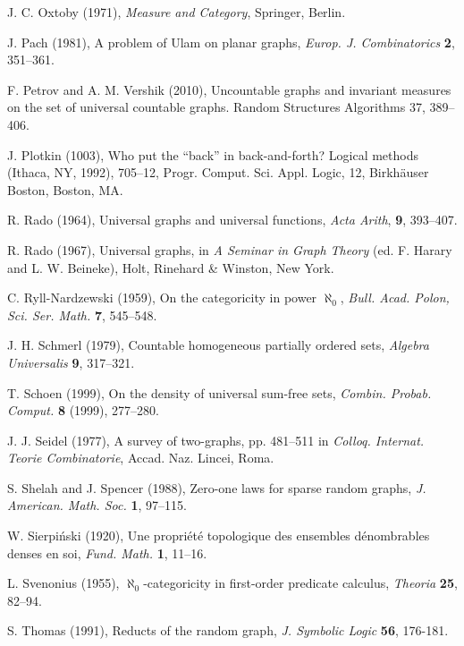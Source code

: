 \documentclass[12pt]{article}
\begin{document}
\begin{thebibliography}{99}
J. C. Oxtoby (1971),
\textit{Measure and Category},
Springer, Berlin.

J. Pach (1981),
A problem of Ulam on planar graphs,
\textit{Europ. J. Combinatorics} \textbf{2}, 351--361.

F. Petrov and A. M. Vershik (2010),
Uncountable graphs and invariant measures on the set of universal
countable graphs.
Random Structures Algorithms 37, 389--406.

J. Plotkin (1003),
Who put the ``back'' in back-and-forth?
Logical methods (Ithaca, NY, 1992), 705--12,
Progr. Comput. Sci. Appl. Logic, 12, Birkhäuser Boston, Boston, MA.

R. Rado (1964),
Universal graphs and universal functions,
\textit{Acta Arith}, \textbf{9}, 393--407.

R. Rado (1967),
Universal graphs,
in \textit{A Seminar in Graph Theory} (ed. F. Harary and L. W. Beineke),
Holt, Rinehard \& Winston, New York.

C. Ryll-Nardzewski (1959),
On the categoricity in power $\aleph_0$,
\textit{Bull. Acad. Polon, Sci. Ser. Math.} \textbf{7}, 545--548.

J. H. Schmerl (1979),
Countable homogeneous partially ordered sets,
\textit{Algebra Universalis} \textbf{9}, 317--321.

T. Schoen (1999),
On the density of universal sum-free sets,
\textit{Combin. Probab. Comput.} \textbf{8} (1999), 277--280.

J. J. Seidel (1977),
A survey of two-graphs,
pp. 481--511 in  \textit{Colloq. Internat. Teorie Combinatorie},
Accad. Naz. Lincei, Roma.

S. Shelah and J. Spencer (1988),
Zero-one laws for sparse random graphs,
\textit{J. American. Math. Soc.} \textbf{1}, 97--115.

W. Sierpi\'{n}ski (1920),
Une propri\'{e}t\'{e} topologique des ensembles d\'{e}nombrables denses en soi, 
\textit{Fund. Math.} \textbf{1}, 11--16.

L. Svenonius (1955),
$\aleph_0$-categoricity in first-order predicate calculus,
\textit{Theoria} \textbf{25}, 82--94.

S. Thomas (1991),
Reducts of the random graph,
\textit{J. Symbolic Logic} \textbf{56}, 176-181.


\end{thebibliography}
\end{document}
